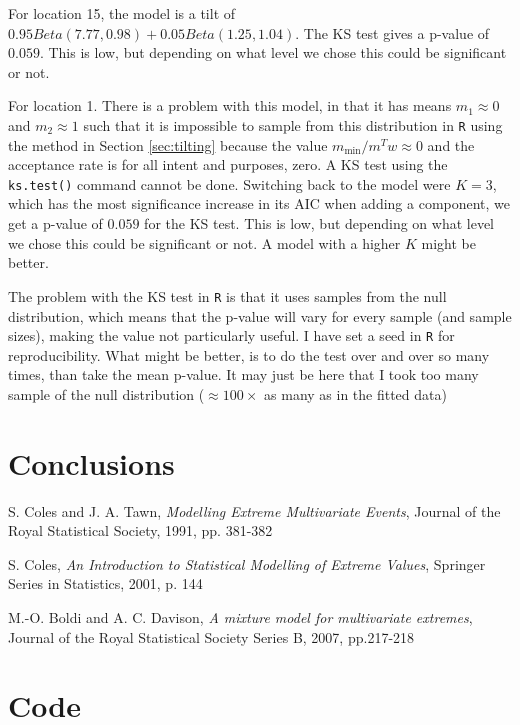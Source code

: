 \documentclass[10pt]{report}
\begin{document}
For location 15, the model is a tilt of $0.95Beta(7.77,0.98) + 0.05Beta(1.25,1.04)$. The KS test gives a p-value of $0.059$. This is low, but depending on what level we chose this could be significant or not.


For location 1.
There is a problem with this model, in that it has means $m_1 \approx 0$ and $m_2 \approx 1$ such that it is impossible to sample from this distribution in \texttt{R} using the method in Section \ref{sec:tilting} because the value $m_{\min}/m^Tw \approx 0$ and the acceptance rate is for all intent and purposes, zero. A KS test using the \texttt{ks.test()} command cannot be done.
Switching back to the model were $K=3$, which has the most significance increase in its AIC when adding a component, we get a p-value of $0.059$ for the KS test. This is low, but depending on what level we chose this could be significant or not.
A model with a higher $K$ might be better.


The problem with the KS test in \texttt{R} is that it uses samples from the null distribution, which means that the p-value will vary for every sample (and sample sizes), making the value not particularly useful. I have set a seed in \texttt{R} for reproducibility. What might be better, is to do the test over and over so many times, than take the mean p-value. It may just be here that I took too many sample of the null distribution ($\approx 100 \times$ as many as in the fitted data)

\chapter{Conclusions}

\begin{thebibliography}{9}

S. Coles and J. A. Tawn, \textit{Modelling Extreme Multivariate Events}, Journal of the Royal Statistical Society, 1991, pp. 381-382

S. Coles, \textit{An Introduction to Statistical Modelling of Extreme Values}, Springer Series in Statistics, 2001, p. 144


M.-O. Boldi and A. C. Davison, \textit{A mixture model for multivariate extremes}, Journal of the Royal Statistical Society Series B,  2007, pp.217-218

\end{thebibliography}


\chapter*{Code}



\end{document}
